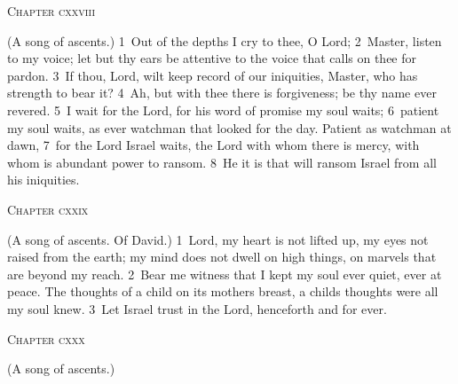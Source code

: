 \documentclass[10pt]{book} %
\begin{document}
\begin{large}\begin{center}\textsc{Chapter cxxviii}\end{center}\end{large}
(A song of ascents.)
\textcolor{benred8}{1}~Out of the depths I cry to thee, O Lord; \textcolor{benred8}{2}~Master, listen to my voice; let but thy ears be attentive to the voice that calls on thee for pardon. \textcolor{benred8}{3}~If thou, Lord, wilt keep record of our iniquities, Master, who has strength to bear it? \textcolor{benred8}{4}~Ah, but with thee there is forgiveness; be thy name ever revered. \textcolor{benred8}{5}~I wait for the Lord, for his word of promise my soul waits; \textcolor{benred8}{6}~patient my soul waits, as ever watchman that looked for the day. Patient as watchman at dawn, \textcolor{benred8}{7}~for the Lord Israel waits, the Lord with whom there is mercy, with whom is abundant power to ransom. \textcolor{benred8}{8}~He it is that will ransom Israel from all his iniquities.
\begin{large}\begin{center}\textsc{Chapter cxxix}\end{center}\end{large}
(A song of ascents. Of David.)
\textcolor{benred8}{1}~Lord, my heart is not lifted up, my eyes not raised from the earth; my mind does not dwell on high things, on marvels that are beyond my reach. \textcolor{benred8}{2}~Bear me witness that I kept my soul ever quiet, ever at peace. The thoughts of a child on its mother\textquotesingle s breast, a child\textquotesingle s thoughts were all my soul knew. \textcolor{benred8}{3}~Let Israel trust in the Lord, henceforth and for ever.
\begin{large}\begin{center}\textsc{Chapter cxxx}\end{center}\end{large}
(A song of ascents.)
\end{document}
